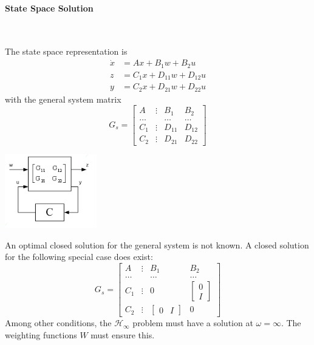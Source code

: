 \paragraph{State Space Solution}~\\
\begin{minipage}{10cm}
    The state space representation is
    \begin{align*}
        \dot{x} &= Ax + B_1 w + B_2 u \\
        z &= C_1 x + D_{11} w + D_{12} u \\
        y &= C_2 x + D_{21}w + D_{22} u
    \end{align*}
    with the general system matrix
    \[
        G_s = \begin{bmatrix}
            A & \vdots & B_1 & B_2 \\
            \dots & & \dots & \dots \\
            C_1 & \vdots & D_{11} & D_{12} \\
            C_2 & \vdots & D_{21} & D_{22}
        \end{bmatrix}
    \]
\end{minipage}
\hspace{0.5cm}
\begin{minipage}{8cm}
    \centering
    \includegraphics[width=4cm]{bilder/hinf_statespace.png}
\end{minipage}

An optimal closed solution for the general system is not known. 
A closed solution for the following special case does exist:
\[
    G_s = \begin{bmatrix}
        A & \vdots & B_1 & B_2 \\
        \dots & & \dots & \dots \\
        C_1 & \vdots & 0 & \begin{bmatrix}0\\I\end{bmatrix} \\
        C_2 & \vdots & \begin{bmatrix}0&I\end{bmatrix} & 0
    \end{bmatrix}
\]
Among other conditions, the $\mathcal{H}_{\infty}$ problem must have
a solution at $\omega = \infty$. The weighting functions $W$ must ensure this.
